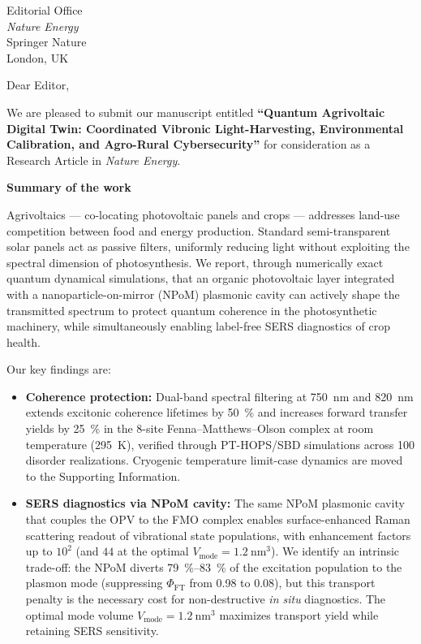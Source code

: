 \documentclass[12pt]{letter}
\begin{document}
\begin{letter}{Editorial Office\\
\textit{Nature Energy}\\
Springer Nature\\
London, UK}

\opening{Dear Editor,}

We are pleased to submit our manuscript entitled \textbf{``Quantum Agrivoltaic Digital Twin: Coordinated Vibronic Light-Harvesting, Environmental Calibration, and Agro-Rural Cybersecurity''} for consideration as a Research Article in \textit{Nature Energy}.

\noindent\textbf{Summary of the work}

Agrivoltaics --- co-locating photovoltaic panels and crops --- addresses land-use competition between food and energy production. Standard semi-transparent solar panels act as passive filters, uniformly reducing light without exploiting the spectral dimension of photosynthesis. We report, through numerically exact quantum dynamical simulations, that an organic photovoltaic layer integrated with a nanoparticle-on-mirror (NPoM) plasmonic cavity can actively shape the transmitted spectrum to protect quantum coherence in the photosynthetic machinery, while simultaneously enabling label-free SERS diagnostics of crop health.

Our key findings are:

\begin{itemize}
\item \textbf{Coherence protection:} Dual-band spectral filtering at \qty{750}{\nm} and \qty{820}{\nm} extends excitonic coherence lifetimes by \qty{50}{\percent} and increases forward transfer yields by \qty{25}{\percent} in the 8-site Fenna--Matthews--Olson complex at room temperature (\qty{295}{\kelvin}), verified through PT-HOPS/SBD simulations across 100 disorder realizations. Cryogenic temperature limit-case dynamics are moved to the Supporting Information.

\item \textbf{SERS diagnostics via NPoM cavity:} The same NPoM plasmonic cavity that couples the OPV to the FMO complex enables surface-enhanced Raman scattering readout of vibrational state populations, with enhancement factors up to $10^2$ (and $44$ at the optimal $V_{\mathrm{mode}} = \qty{1.2}{\nm\cubed}$). We identify an intrinsic trade-off: the NPoM diverts \qty{79}{\percent}{--}\qty{83}{\percent} of the excitation population to the plasmon mode (suppressing $\Phi_{\mathrm{FT}}$ from 0.98 to 0.08), but this transport penalty is the necessary cost for non-destructive \emph{in situ} diagnostics. The optimal mode volume $V_{\mathrm{mode}} = \qty{1.2}{\nm\cubed}$ maximizes transport yield while retaining SERS sensitivity.


\end{itemize}
\end{letter}
\end{document}
